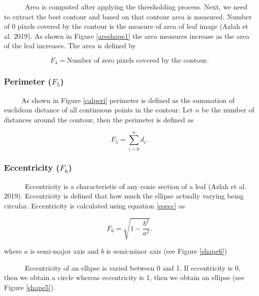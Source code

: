 \documentclass{article}
\begin{document}
~~~~~~Area is computed after applying the thresholding process. Next, we
need to extract the best contour and based on that contour area is
measured. Number of 0 pixels covered by the contour is the measure of
area of leaf image (Azlah et al. 2019). As shown in Figure
\ref{areshape1} the area measures increase as the area of the leaf
increases. The area is defined by

\begin{equation}
   F_4 = \text{Number of zero pixels covered by the contour}.
\label{equa_F4}
\end{equation}

\hypertarget{perimeter-f_5}{%
\subsubsection{\texorpdfstring{Perimeter
(\(F_5\))}{Perimeter (F\_5)}}\label{perimeter-f_5}}

~~~~~As shown in Figure \ref{calperi} perimeter is defined as the
summation of euclidean distance of all continuous points in the contour.
Let \(n\) be the number of distances around the contour, then the
perimeter is defined as

\begin{equation}
   F_5 =  \sum_{i=0}^{n}d_i.
\label{equa_F5}
\end{equation}

\hypertarget{eccentricity-f_6}{%
\subsubsection{\texorpdfstring{Eccentricity
(\(F_6\))}{Eccentricity (F\_6)}}\label{eccentricity-f_6}}

~~~~~~Eccentricity is a characteristic of any conic section of a leaf
(Azlah et al. 2019). Eccentricity is defined that how much the ellipse
actually varying being circular. Eccentricity is calculated using
equation \ref{eqecc} as

\begin{equation}
    F_6 = \sqrt{1-\frac{b^2}{a^2}}.
    \label{eqecc}
\end{equation}

where \(a\) is semi-major axis and \(b\) is semi-minor axis (see Figure
\ref{shape6})

~~~~~~Eccentricity of an ellipse is varied between 0 and 1. If
eccentricity is 0, then we obtain a circle whereas eccentricity is 1,
then we obtain an ellipse (see Figure \ref{shape5}).
\end{document}
